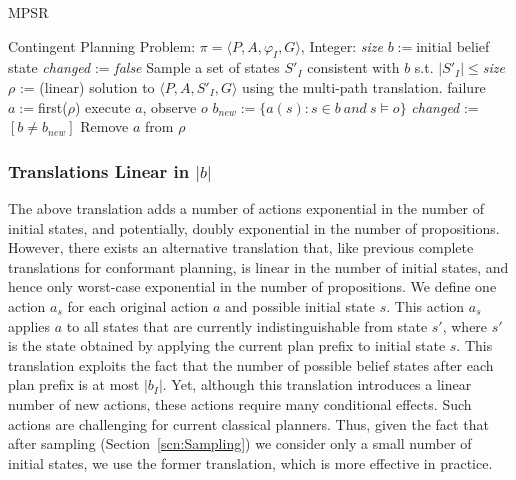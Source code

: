 \documentclass[letterpaper]{article}
\numberwithin{equation}{section}	%
\begin{document}
  \begin{algorithm}[h!]
\scriptsize
    \caption{MPSR}
    \label{planner}
\begin{algorithmic} %
      \REQUIRE Contingent Planning Problem: $\pi= \langle P,A,\varphi_I,G \rangle$, Integer: \emph{size}
      \STATE $b :=  $initial belief state
      \STATE \emph{changed} :=\emph{ false}
        	\STATE Sample a  set of states $S'_I$ consistent with $b$ s.t. $|S'_I|\leq$\emph{size}
	\STATE $\rho$ := (linear) solution to $\langle P,A,S'_I,G\rangle$ using the multi-path translation.
	\RETURN failure
	\ENDIF
		\STATE $a :=  $first($\rho$)
		\STATE execute $a$, observe $o$
	       	\STATE $b_{new} :=  \{ a(s) : s\in b\ and\ s\models o\}$
		\STATE \emph{changed} := $[b \neq b_{new}]$
		\STATE Remove $a$ from $\rho$
	\ENDWHILE
    	\ENDWHILE
    \end{algorithmic}
  \end{algorithm}

\subsubsection{Translations Linear in $|b|$}

The above translation adds a number of actions exponential in the number of initial states, and potentially, doubly exponential
in the number of propositions. However, there exists an alternative translation that, like previous complete translations
for conformant planning, is linear in the number of initial states, and hence only worst-case exponential in the number of propositions.
We define one action $a_s$ for each original action $a$ and possible initial state $s$. This action $a_s$ applies $a$ to all
states that are currently indistinguishable from state $s'$, where $s'$ is the state obtained by applying the current plan prefix to initial state $s$.
This translation exploits the fact that the number of possible belief states after each plan prefix is at most $|b_I|$.
Yet, although this translation introduces a linear number of new actions, these actions require many conditional effects.
Such actions are challenging for current classical planners. Thus, given the fact that after sampling (Section~\ref{scn:Sampling}) we consider only a
small number of initial states, we use the former translation, which is more effective in practice.
\end{document}
